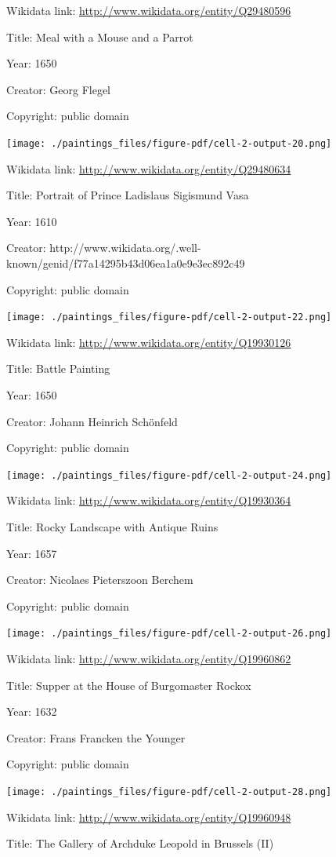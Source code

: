 \documentclass[
  letterpaper,
]{book}
\begin{document}
Wikidata link: \url{http://www.wikidata.org/entity/Q29480596}

Title: Meal with a Mouse and a Parrot

Year: 1650

Creator: Georg Flegel

Copyright: public domain

\texttt{[image: ./paintings\_files/figure-pdf/cell-2-output-20.png]}

Wikidata link: \url{http://www.wikidata.org/entity/Q29480634}

Title: Portrait of Prince Ladislaus Sigismund Vasa

Year: 1610

Creator:
http://www.wikidata.org/.well-known/genid/f77a14295b43d06ea1a0e9e3ec892c49

Copyright: public domain

\texttt{[image: ./paintings\_files/figure-pdf/cell-2-output-22.png]}

Wikidata link: \url{http://www.wikidata.org/entity/Q19930126}

Title: Battle Painting

Year: 1650

Creator: Johann Heinrich Schönfeld

Copyright: public domain

\texttt{[image: ./paintings\_files/figure-pdf/cell-2-output-24.png]}

Wikidata link: \url{http://www.wikidata.org/entity/Q19930364}

Title: Rocky Landscape with Antique Ruins

Year: 1657

Creator: Nicolaes Pieterszoon Berchem

Copyright: public domain

\texttt{[image: ./paintings\_files/figure-pdf/cell-2-output-26.png]}

Wikidata link: \url{http://www.wikidata.org/entity/Q19960862}

Title: Supper at the House of Burgomaster Rockox

Year: 1632

Creator: Frans Francken the Younger

Copyright: public domain

\texttt{[image: ./paintings\_files/figure-pdf/cell-2-output-28.png]}

Wikidata link: \url{http://www.wikidata.org/entity/Q19960948}

Title: The Gallery of Archduke Leopold in Brussels (II)
\end{document}
